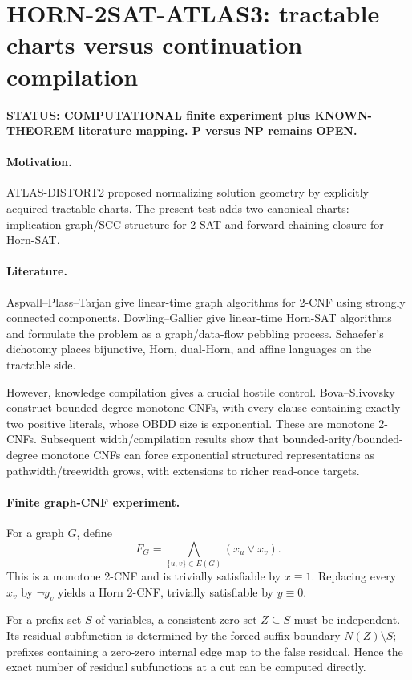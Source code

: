\section*{HORN-2SAT-ATLAS3: tractable charts versus continuation compilation}

\textbf{STATUS: COMPUTATIONAL finite experiment plus KNOWN-THEOREM literature mapping. P versus NP remains OPEN.}

\paragraph{Motivation.}
ATLAS-DISTORT2 proposed normalizing solution geometry by explicitly acquired tractable charts.
The present test adds two canonical charts: implication-graph/SCC structure for 2-SAT and
forward-chaining closure for Horn-SAT.

\paragraph{Literature.}
Aspvall--Plass--Tarjan give linear-time graph algorithms for 2-CNF using strongly connected
components. Dowling--Gallier give linear-time Horn-SAT algorithms and formulate the problem
as a graph/data-flow pebbling process. Schaefer's dichotomy places bijunctive, Horn,
dual-Horn, and affine languages on the tractable side.

However, knowledge compilation gives a crucial hostile control. Bova--Slivovsky construct
bounded-degree monotone CNFs, with every clause containing exactly two positive literals,
whose OBDD size is exponential. These are monotone 2-CNFs. Subsequent width/compilation
results show that bounded-arity/bounded-degree monotone CNFs can force exponential structured
representations as pathwidth/treewidth grows, with extensions to richer read-once targets.

\paragraph{Finite graph-CNF experiment.}
For a graph $G$, define
\[
F_G=\bigwedge_{\{u,v\}\in E(G)}(x_u\vee x_v).
\]
This is a monotone 2-CNF and is trivially satisfiable by $x\equiv1$. Replacing every
$x_v$ by $\neg y_v$ yields a Horn 2-CNF, trivially satisfiable by $y\equiv0$.

For a prefix set $S$ of variables, a consistent zero-set $Z\subseteq S$ must be independent.
Its residual subfunction is determined by the forced suffix boundary $N(Z)\setminus S$;
prefixes containing a zero-zero internal edge map to the false residual. Hence the exact
number of residual subfunctions at a cut can be computed directly.

